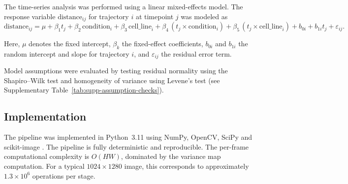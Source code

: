 The time-series analysis was performed using a linear mixed-effects model. The response variable $\mathrm{distance}_{ij}$ for trajectory $i$ at timepoint $j$ was modeled as
\[
\mathrm{distance}_{ij}
= \mu
+ \beta_1 t_j
+ \beta_2 \,\mathrm{condition}_i
+ \beta_3 \,\mathrm{cell\_line}_i
+ \beta_4 \,(t_j \times \mathrm{condition}_i)
+ \beta_5 \,(t_j \times \mathrm{cell\_line}_i)
+ b_{0i}
+ b_{1i} t_j
+ \varepsilon_{ij}.
\]

Here, $\mu$ denotes the fixed intercept, $\beta_k$ the fixed-effect coefficients, $b_{0i}$ and $b_{1i}$ the random intercept and slope for trajectory $i$, and $\varepsilon_{ij}$ the residual error term.

Model assumptions were evaluated by testing residual normality using the Shapiro--Wilk test and homogeneity of variance using Levene's test (see Supplementary Table~\ref{tab:supp-assumption-checks}).

\subsection{Implementation}
The pipeline was implemented in Python~3.11 using NumPy, OpenCV, SciPy and scikit-image \citep{vanderWalt2014}. The pipeline is fully deterministic and reproducible. The per-frame computational complexity is $O(HW)$, dominated by the variance map computation. For a typical $1024 \times 1280$ image, this corresponds to approximately $1.3 \times 10^6$ operations per stage.
